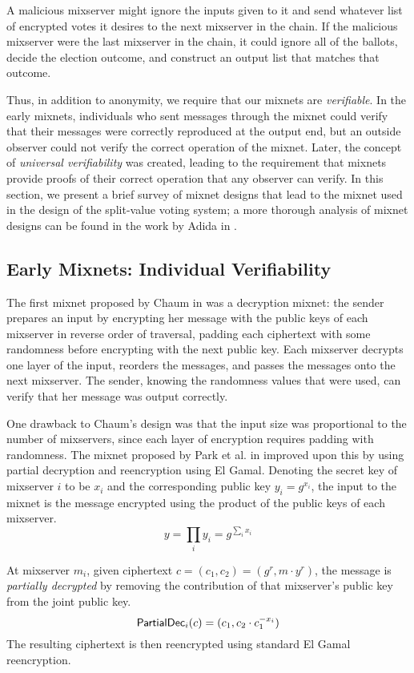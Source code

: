 A malicious mixserver might ignore the inputs given to it and send whatever list of encrypted votes it desires to the next mixserver in the chain. If the malicious mixserver were the last mixserver in the chain, it could ignore all of the ballots, decide the election outcome, and construct an output list that matches that outcome.

Thus, in addition to anonymity, we require that our mixnets are \emph{verifiable}. In the early mixnets, individuals who sent messages through the mixnet could verify that their messages were correctly reproduced at the output end, but an outside observer could not verify the correct operation of the mixnet. Later, the concept of \emph{universal verifiability} was created, leading to the requirement that mixnets provide proofs of their correct operation that any observer can verify. In this section, we present a brief survey of mixnet designs that lead to the mixnet used in the design of the split-value voting system; a more thorough analysis of mixnet designs can be found in the work by Adida in \cite{adida-phd}.

\subsection{Early Mixnets: Individual Verifiability}

The first mixnet proposed by Chaum in \cite{chaum81} was a decryption mixnet: the sender prepares an input by encrypting her message with the public keys of each mixserver in reverse order of traversal, padding each ciphertext with some randomness before encrypting with the next public key. Each mixserver decrypts one layer of the input, reorders the messages, and passes the messages onto the next mixserver. The sender, knowing the randomness values that were used, can verify that her message was output correctly.

One drawback to Chaum's design was that the input size was proportional to the number of mixservers, since each layer of encryption requires padding with randomness. The mixnet proposed by Park et al. in \cite{park94} improved upon this by using partial decryption and reencryption using El Gamal. Denoting the secret key of mixserver $i$ to be $x_i$ and the corresponding public key $y_i = g^{x_i}$, the input to the mixnet is the message encrypted using the product of the public keys of each mixserver.
$$
y = \prod_{i}{y_i} = g^{\sum_{i}{x_i}}
$$

At mixserver $m_i$, given ciphertext $c = (c_1, c_2) = (g^r, m \cdot y^r)$, the message is \emph{partially decrypted} by removing the contribution of that mixserver's public key from the joint public key.
$$
\operatorname{\mathsf{PartialDec}}_{i}(c) = (c_1, c_2 \cdot c_{1}^{-x_i})
$$
The resulting ciphertext is then reencrypted using standard El Gamal reencryption.

